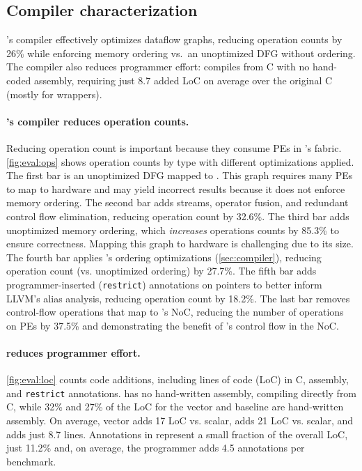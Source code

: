\subsection{Compiler characterization}
\riptide's compiler effectively optimizes dataflow graphs, reducing operation
counts by 26\% while enforcing memory ordering vs.\ an unoptimized DFG without
ordering.
% 
The compiler also reduces programmer effort: \riptide compiles from C with
no hand-coded assembly, requiring just 8.7 added LoC on average over the original
C (mostly for wrappers).

\paragraph{\riptide's compiler reduces operation counts.} Reducing operation count
is important because they consume PEs in \riptide's fabric.
%
\autoref{fig:eval:ops} shows operation counts by type with different optimizations applied.
% 
The first bar is an unoptimized DFG mapped to \riptide.
% 
This graph requires many PEs to map to hardware and may yield incorrect
results because it does not enforce memory ordering.
% 
The second bar adds streams, operator fusion, and redundant control flow
elimination, reducing operation count by 32.6\%.
% 
The third bar adds unoptimized memory ordering, which {\em increases} operations counts by 85.3\% to ensure correctness.
% 
Mapping this graph to hardware is challenging due to its size.
% 
The fourth bar applies \riptide's ordering optimizations (\autoref{sec:compiler}), reducing operation count (vs. unoptimized ordering) by 27.7\%.
% 
The fifth bar adds programmer-inserted ({\tt restrict}) annotations on pointers
to better inform LLVM's alias analysis, reducing operation count by 18.2\%.
% 
The last bar removes control-flow operations that map to \riptide's NoC, reducing
the number of operations on PEs by 37.5\% and demonstrating the benefit of
\riptide's control flow in the NoC.
% 

\paragraph{\riptide reduces programmer effort.}
\autoref{fig:eval:loc} counts code additions, including lines of code (LoC) in C, assembly, and {\tt restrict} annotations.  
%
\riptide has no hand-written assembly, compiling directly from C, while  32\% and
27\% of the LoC for the vector and \snafu baseline are hand-written assembly.
% 
On average, vector adds 17 LoC vs. scalar, \snafu adds 21 LoC vs. scalar, and
\riptide adds just 8.7 lines.
% 
Annotations in \riptide represent a small fraction of the overall LoC, just 11.2\%
and, on average, the programmer adds 4.5 annotations per benchmark.

